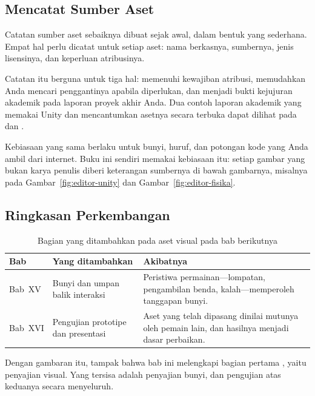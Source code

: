 \subsection{Mencatat Sumber Aset}

Catatan sumber aset sebaiknya dibuat sejak awal, dalam bentuk yang sederhana.
Empat hal perlu dicatat untuk setiap aset: nama berkasnya, sumbernya, jenis
lisensinya, dan keperluan atribusinya.

Catatan itu berguna untuk tiga hal: memenuhi kewajiban atribusi, memudahkan
Anda mencari penggantinya apabila diperlukan, dan menjadi bukti kejujuran
akademik pada laporan proyek akhir Anda. Dua contoh laporan akademik yang
memakai Unity dan mencantumkan asetnya secara terbuka dapat dilihat pada
\cite{uny-katelu} dan \cite{undip-media}.

\begin{tipsbox}
Kebiasaan yang sama berlaku untuk bunyi, huruf, dan potongan kode yang Anda
ambil dari internet. Buku ini sendiri memakai kebiasaan itu: setiap gambar yang
bukan karya penulis diberi keterangan sumbernya di bawah gambarnya, misalnya
pada Gambar~\ref{fig:editor-unity} dan Gambar~\ref{fig:editor-fisika}.
\end{tipsbox}

\subsection{Ringkasan Perkembangan}

\begin{table}[htbp]
\centering
\caption{Bagian yang ditambahkan pada aset visual pada bab berikutnya}
\label{tab:perkembangan-aset}
{\setlength{\tabcolsep}{4pt}\footnotesize%
\begin{tabularx}{\textwidth}{@{}C{1.6cm} L{5.0cm} Y@{}}
\toprule
\headrow \textbf{Bab} & \textbf{Yang ditambahkan} & \textbf{Akibatnya} \\
\midrule
Bab~XV & Bunyi dan umpan balik interaksi &
Peristiwa permainan---lompatan, pengambilan benda, kalah---memperoleh tanggapan
bunyi. \\
\addlinespace
Bab~XVI & Pengujian prototipe dan presentasi &
Aset yang telah dipasang dinilai mutunya oleh pemain lain, dan hasilnya
menjadi dasar perbaikan. \\
\bottomrule
\end{tabularx}}
\end{table}

Dengan gambaran itu, tampak bahwa bab ini melengkapi bagian pertama ,
yaitu penyajian visual. Yang tersisa adalah penyajian bunyi, dan pengujian atas
keduanya secara menyeluruh.
